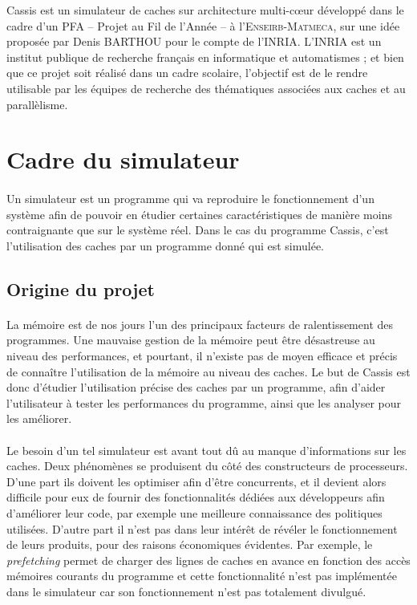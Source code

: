 \textsf{Cassis} est un simulateur de caches sur architecture multi-c\oe ur développé dans le cadre d'un PFA -- Projet au Fil de l'Année -- à l'\textsc{Enseirb-Matmeca}, sur une idée proposée par Denis BARTHOU pour le compte de l'\textsf{INRIA}. L'\textsf{INRIA} est un institut publique de recherche français en informatique et automatismes ; et bien que ce projet soit réalisé dans un cadre scolaire, l'objectif est de le rendre utilisable par les équipes de recherche des thématiques associées aux caches et au parallèlisme.

\section{Cadre du simulateur}

\paragraph{}
Un simulateur est un programme qui va reproduire le fonctionnement d'un système afin de pouvoir en étudier certaines caractéristiques de manière moins contraignante que sur le système réel. Dans le cas du programme \textsf{Cassis}, c'est l'utilisation des caches par un programme donné qui est simulée.

\subsection{Origine du projet}

\paragraph{}
La mémoire est de nos jours l'un des principaux facteurs de ralentissement des programmes. Une mauvaise gestion de la mémoire peut être désastreuse au niveau des performances, et pourtant, il n'existe pas de moyen efficace et précis de connaître l'utilisation de la mémoire au niveau des caches. Le but de \textsf{Cassis} est donc d'étudier l'utilisation précise des caches par un programme, afin d'aider l'utilisateur à tester les performances du programme, ainsi que les analyser pour les améliorer.

\paragraph{}
Le besoin d'un tel simulateur est avant tout dû au manque d'informations sur les caches. Deux phénomènes se produisent du côté des constructeurs de processeurs. D'une part ils doivent les optimiser afin d'être concurrents, et il devient alors difficile pour eux de fournir des fonctionnalités dédiées aux développeurs afin d'améliorer leur code, par exemple une meilleure connaissance des politiques utilisées. D'autre part il n'est pas dans leur intérêt de révéler le fonctionnement de leurs produits, pour des raisons économiques évidentes. Par exemple, le \emph{prefetching} permet de charger des lignes de caches en avance en fonction des accès mémoires courants du programme et cette fonctionnalité n'est pas implémentée dans le simulateur car son fonctionnement n'est pas totalement divulgué.

